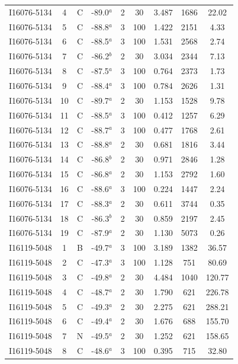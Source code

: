 \begin{table}
\begin{tabular}{ccccccccc}
I16076-5134 & 4 & C & -89.0$^{a}$ & 2 & 30 & 3.487 & 1686 & 22.02 \\
I16076-5134 & 5 & C & -88.8$^{a}$ & 3 & 100 & 1.422 & 2151 & 4.33 \\
I16076-5134 & 6 & C & -88.5$^{a}$ & 3 & 100 & 1.531 & 2568 & 2.74 \\
I16076-5134 & 7 & C & -86.2$^{b}$ & 2 & 30 & 3.034 & 2344 & 7.13 \\
I16076-5134 & 8 & C & -87.5$^{a}$ & 3 & 100 & 0.764 & 2373 & 1.73 \\
I16076-5134 & 9 & C & -88.4$^{a}$ & 3 & 100 & 0.784 & 2626 & 1.31 \\
I16076-5134 & 10 & C & -89.7$^{a}$ & 2 & 30 & 1.153 & 1528 & 9.78 \\
I16076-5134 & 11 & C & -88.5$^{a}$ & 3 & 100 & 0.412 & 1257 & 6.29 \\
I16076-5134 & 12 & C & -88.7$^{a}$ & 3 & 100 & 0.477 & 1768 & 2.61 \\
I16076-5134 & 13 & C & -88.8$^{a}$ & 2 & 30 & 0.681 & 1816 & 3.44 \\
I16076-5134 & 14 & C & -86.8$^{b}$ & 2 & 30 & 0.971 & 2846 & 1.28 \\
I16076-5134 & 15 & C & -86.8$^{a}$ & 2 & 30 & 1.153 & 2792 & 1.60 \\
I16076-5134 & 16 & C & -88.6$^{a}$ & 3 & 100 & 0.224 & 1447 & 2.24 \\
I16076-5134 & 17 & C & -88.3$^{a}$ & 2 & 30 & 0.611 & 3744 & 0.35 \\
I16076-5134 & 18 & C & -86.3$^{b}$ & 2 & 30 & 0.859 & 2197 & 2.45 \\
I16076-5134 & 19 & C & -87.9$^{a}$ & 2 & 30 & 1.130 & 5073 & 0.26 \\
I16119-5048 & 1 & B & -49.7$^{a}$ & 3 & 100 & 3.189 & 1382 & 36.57 \\
I16119-5048 & 2 & C & -47.3$^{a}$ & 3 & 100 & 1.128 & 751 & 80.69 \\
I16119-5048 & 3 & C & -49.8$^{a}$ & 2 & 30 & 4.484 & 1040 & 120.77 \\
I16119-5048 & 4 & C & -48.7$^{a}$ & 2 & 30 & 1.790 & 621 & 226.78 \\
I16119-5048 & 5 & C & -49.3$^{a}$ & 2 & 30 & 2.275 & 621 & 288.21 \\
I16119-5048 & 6 & C & -49.4$^{a}$ & 2 & 30 & 1.676 & 688 & 155.70 \\
I16119-5048 & 7 & N & -49.5$^{a}$ & 2 & 30 & 1.252 & 621 & 158.65 \\
I16119-5048 & 8 & C & -48.6$^{a}$ & 3 & 100 & 0.395 & 715 & 32.80 \\

\end{tabular}
\end{table}
